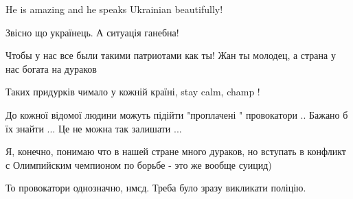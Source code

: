 \begin{itemize}
He is amazing and he speaks Ukrainian beautifully!

 
Звісно що українець. А ситуація ганебна!

 
Чтобы у нас все были такими патриотами как ты! Жан ты молодец, а страна у нас богата на дураков

 
Таких придурків чимало у кожній країні, stay calm, champ !

 
До кожної відомої людини можуть підійти "проплачені " провокатори .. Бажано б їх знайти ... Це не можна так залишати ...

 
Я, конечно, понимаю что в нашей стране много дураков, но вступать в конфликт с Олимпийским чемпионом по борьбе - это же вообще суицид)

 
То провокатори однозначно, нмсд. Треба було зразу викликати поліцію.


\end{itemize}
